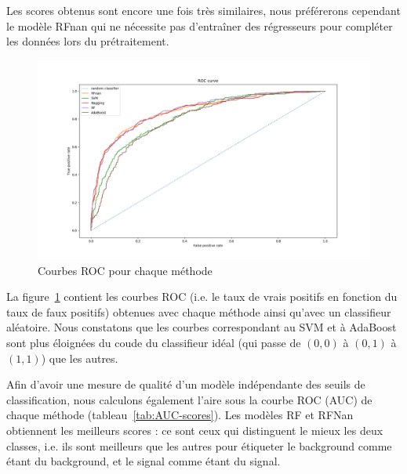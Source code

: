 \documentclass[12pt]{article}
\newcommand{\figref}[1]{figure~\ref{#1}}
\newcommand{\tabref}[1]{tableau~\ref{#1}}
\begin{document}
Les scores obtenus sont encore une fois très similaires, nous préférerons
cependant le modèle RFnan qui ne nécessite pas d'entraîner des régresseurs pour
compléter les données lors du prétraitement. 

\begin{figure}[H]
    \center
    \includegraphics[width=\textwidth]{images/ROC_curves.png}
    \caption{Courbes ROC pour chaque méthode}
    \label{img:roc-curves}
\end{figure}

La \figref{img:roc-curves} contient les courbes ROC (i.e. le taux de vrais
positifs en fonction du taux de faux positifs) obtenues avec chaque méthode
ainsi qu'avec un classifieur aléatoire. Nous constatons que les courbes
correspondant au SVM et à AdaBoost sont plus éloignées du coude du classifieur
idéal (qui passe de $(0,0)$ à $(0,1)$ à $(1,1)$) que les autres. 

Afin d'avoir une mesure de qualité d'un modèle indépendante des seuils de
classification, nous calculons également l'aire sous la courbe ROC (AUC) de
chaque méthode (\tabref{tab:AUC-scores}). Les modèles RF et RFNan obtiennent les
meilleurs scores : ce sont ceux qui distinguent le mieux les deux classes, i.e. ils
sont meilleurs que les autres pour étiqueter le background comme étant du
background, et le signal comme étant du signal. \\


\begin{table}[H]
\centering
{}
\caption{AUC obtenus avec chaque méthode}
\label{tab:AUC-scores}
\end{table}


\newpage
\printbibliography
\end{document}
